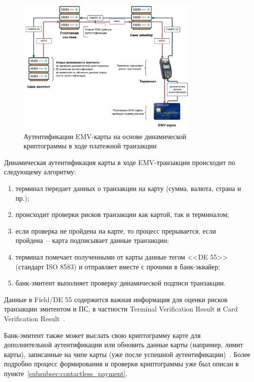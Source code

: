 \begin{figure}[H]
    \centering
    \includegraphics[width=0.8\textwidth]{images/research/emv_card_auth}
    \caption{\centering Аутентификации EMV-карты на основе динамической криптограммы в ходе платежной транзакции}
    \label{fig:emv_card_auth}
\end{figure}

Динамическая аутентификация карты в ходе EMV-транзакции происходит по следующему алгоритму:

\begin{enumerate}
    \item терминал передает данных о транзакции на карту (сумма, валюта, страна и пр.);
    \item происходит проверки рисков транзакции как картой, так и терминалом;
    \item если проверка не пройдена на карте, то процесс прерывается, если пройдена~-- карта подписывает данные транзакции;
    \item терминал помечает полученными от карты данные тегом <<DE 55>> (стандарт ISO 8583) и отправляет вместе с прочими в банк-эквайер;
    \item банк-эмитент выполняет проверку динамической подписи транзакции.
\end{enumerate}

Данные в Field/DE 55 содержится важная информация для оценки рисков транзакции  эмитентом и ПС, в частности Terminal Verification Result и Card Verification Result~\cite{emv_card_mechanism}.

Банк-эмитент также может выслать свою криптограмму карте для дополнительной аутентификации или обновить данные карты (например, лимит карты), записанные на чипе карты (уже после успешной аутентификации)~\cite{emv_book_2}.
Более подробно процесс формирования и проверки криптограммы уже был описан в пункте~\ref{subsubsec:contactless_payment}.

